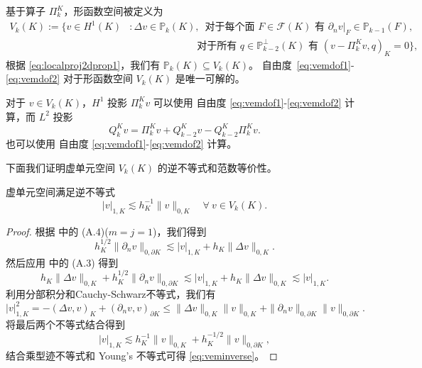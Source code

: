 基于算子 $\Pi_k^K$，形函数空间被定义为
\begin{align*}
V_k(K):=\{v\in H^1(K) &: \Delta v\in\mathbb P_{k}(K),\, \text{ 对于每个面 }F
    \in\mathcal F(K) \text{ 有 }\partial_nv|_F\in\mathbb P_{k-1}(F), \\
&\qquad\qquad\qquad\;\, \text{ 对于所有 }q\in \mathbb P_{k-2}^{\perp}(K)\text{ 有 }(v-\Pi_k^Kv, q)_K=0\},
\end{align*}
根据 \eqref{eq:localproj2dprop1}，我们有 $\mathbb P_k(K)\subseteq V_k(K)$。
自由度~\eqref{eq:vemdof1}-\eqref{eq:vemdof2} 对于形函数空间 $V_k(K)$ 是唯一可解的。

对于 $v\in V_k(K)$，$H^1$ 投影 $\Pi_k^Kv$ 可以使用 自由度 \eqref{eq:vemdof1}-\eqref{eq:vemdof2} 计算，而 $L^2$ 投影
\begin{equation}\label{eq:QKPik}
    Q_k^Kv= \Pi_k^Kv + Q_{k-2}^Kv-Q_{k-2}^K\Pi_k^Kv.
\end{equation}
也可以使用 自由度 \eqref{eq:vemdof1}-\eqref{eq:vemdof2} 计算。

下面我们证明虚单元空间 $V_k(K)$ 的逆不等式和范数等价性。
\begin{lemma}\label{lem:veminverse}
虚单元空间满足逆不等式
\begin{equation}\label{eq:veminverse}
|v|_{1,K}\lesssim h_K^{-1}\|v\|_{0,K}\quad\forall~v\in V_k(K).  
\end{equation}
\end{lemma}
\begin{proof}
根据 \cite{ChenHuang2020ncvem} 中的 (A.4)($m=j=1$)，我们得到
\[
h_K^{1/2}\|\partial_nv\|_{0,\partial K}\lesssim |v|_{1,K}+h_K\|\Delta v\|_{0,K}.
\]
然后应用 \cite{ChenHuang2020ncvem} 中的 (A.3) 得到
\[
h_K\|\Delta v\|_{0,K}+h_K^{1/2}\|\partial_nv\|_{0,\partial K}\lesssim |v|_{1,K}+h_K\|\Delta v\|_{0,K}\lesssim |v|_{1,K}.
\]
利用分部积分和Cauchy-Schwarz不等式，我们有
\[
|v|_{1,K}^2=-(\Delta v,v)_K+(\partial_nv,v)_{\partial K}\leq\|\Delta v\|_{0,K}\|v\|_{0,K}+\|\partial_nv\|_{0,\partial K}\|v\|_{0,\partial K}.
\]
将最后两个不等式结合得到
\[
|v|_{1,K}\lesssim h_K^{-1}\|v\|_{0,K}+h_K^{-1/2}\|v\|_{0,\partial K},
\]
结合乘型迹不等式和 Young's 不等式可得 \eqref{eq:veminverse}。
\end{proof}

